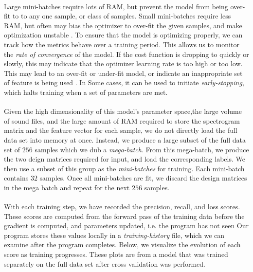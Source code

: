 \documentclass[12pt,letterpaper]{article}
\begin{document}
\paragraph*{}Large mini-batches require lots of RAM, but prevent the model from being over-fit to to any one sample, or class of samples. Small mini-batches require less RAM, but often may bias the optimizer to over-fit the given samples, and make optimization unstable \cite{Geron,James}. To ensure that the model is optimizing properly, we can track how the metrics behave over a training period. This allows us to monitor the \textit{rate of convergence} of the model. If the cost function is dropping to quickly or slowly, this may indicate that the optimizer learning rate is too high or too low. This may lead to an over-fit or under-fit model, or indicate an inappropriate set of feature is being used \cite{Geron,Goodfellow}. In Some cases, it can be used to initiate \textit{early-stopping}, which halts training when a set of parameters are met. 

\paragraph*{}Given the high dimensionality of this model's parameter space,the large volume of sound files, and the large amount of RAM required to store the spectrogram matrix and the feature vector for each sample, we do not directly load the full data set into memory at once. Instead, we produce a large subset of the full data set of $256$ samples which we dub a \textit{mega-batch}. From this mega-batch, we produce the two deign matrices required for input, and load the corresponding labels. We then use a subset of this group as the \textit{mini-batches} for training. Each mini-batch contains $32$ samples. Once all mini-batches are fit, we discard the design matrices in the mega batch and repeat for the next $256$ samples. 

\paragraph*{}With each training step, we have recorded the precision, recall, and loss scores. These scores are computed from the forward pass of the training data before the gradient is computed, and parameters updated, i.e. the program has not seen Our program stores these values locally in a \textit{training-history} file, which we can examine after the program completes. Below, we visualize the evolution of each score as training progresses. These plots are from a model that was trained separately on the full data set after cross validation was performed.
\end{document}
